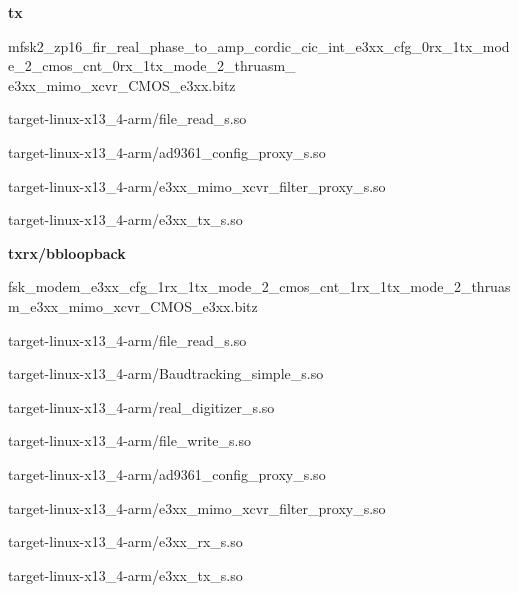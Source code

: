 	\noindent\textbf{tx}
	\begin{itemize}
  \item mfsk2\_zp16\_fir\_real\_phase\_to\_amp\_cordic\_cic\_int\_e3xx\_cfg\_0rx\_1tx\_mode\_2\_cmos\_cnt\_0rx\_1tx\_mode\_2\_thruasm\_ \\
	e3xx\_mimo\_xcvr\_CMOS\_e3xx.bitz \\

	\begin{minipage}[t]{.5\textwidth}
	\item target-linux-x13\_4-arm/file\_read\_s.so
	\item target-linux-x13\_4-arm/ad9361\_config\_proxy\_s.so
	\end{minipage}
	\begin{minipage}[t]{.5\textwidth}
	\item target-linux-x13\_4-arm/e3xx\_mimo\_xcvr\_filter\_proxy\_s.so
	\item target-linux-x13\_4-arm/e3xx\_tx\_s.so
	\end{minipage}
	\end{itemize}

	\noindent\textbf{txrx/bbloopback}
	\begin{itemize}
  \item fsk\_modem\_e3xx\_cfg\_1rx\_1tx\_mode\_2\_cmos\_cnt\_1rx\_1tx\_mode\_2\_thruasm\_e3xx\_mimo\_xcvr\_CMOS\_e3xx.bitz \\

	\begin{minipage}[t]{.5\textwidth}
	\item target-linux-x13\_4-arm/file\_read\_s.so
	\item target-linux-x13\_4-arm/Baudtracking\_simple\_s.so
	\item target-linux-x13\_4-arm/real\_digitizer\_s.so
	\end{minipage}
	\begin{minipage}[t]{.5\textwidth}
	\item target-linux-x13\_4-arm/file\_write\_s.so
	\item target-linux-x13\_4-arm/ad9361\_config\_proxy\_s.so
	\item target-linux-x13\_4-arm/e3xx\_mimo\_xcvr\_filter\_proxy\_s.so
	\item target-linux-x13\_4-arm/e3xx\_rx\_s.so
	\item target-linux-x13\_4-arm/e3xx\_tx\_s.so
	\end{minipage}
	\end{itemize}




